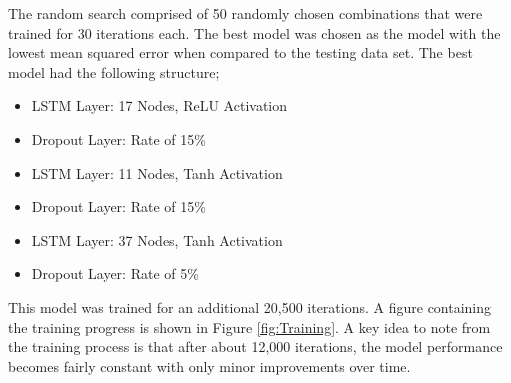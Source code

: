The random search comprised of 50 randomly chosen combinations that were trained for 30 iterations each. The best model was chosen as the model with the lowest mean squared error when compared to the testing data set. The best model had the following structure;

\begin{itemize}
    \item LSTM Layer: 17 Nodes, ReLU Activation
    \item Dropout Layer: Rate of 15\%
    \item LSTM Layer: 11 Nodes, Tanh Activation
    \item Dropout Layer: Rate of 15\%
    \item LSTM Layer: 37 Nodes, Tanh Activation
    \item Dropout Layer: Rate of 5\%
\end{itemize}

This model was trained for an additional 20,500 iterations. A figure containing the training progress is shown in Figure \ref{fig:Training}. A key idea to note from the training process is that after about 12,000 iterations, the model performance becomes fairly constant with only minor improvements over time.

